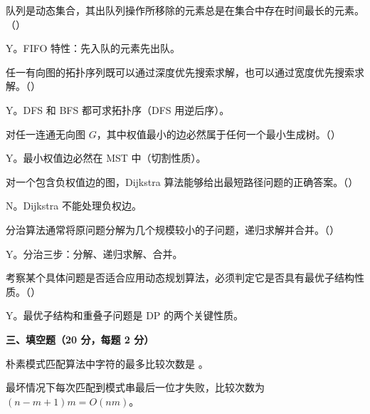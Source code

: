 \begin{question}
队列是动态集合，其出队列操作所移除的元素总是在集合中存在时间最长的元素。（\quad）
\begin{solution}
Y。FIFO 特性：先入队的元素先出队。
\end{solution}
\end{question}

\begin{question}
任一有向图的拓扑序列既可以通过深度优先搜索求解，也可以通过宽度优先搜索求解。（\quad）
\begin{solution}
Y。DFS 和 BFS 都可求拓扑序（DFS 用逆后序）。
\end{solution}
\end{question}

\begin{question}
对任一连通无向图 $G$，其中权值最小的边必然属于任何一个最小生成树。（\quad）
\begin{solution}
Y。最小权值边必然在 MST 中（切割性质）。
\end{solution}
\end{question}

\begin{question}
对一个包含负权值边的图，Dijkstra 算法能够给出最短路径问题的正确答案。（\quad）
\begin{solution}
N。Dijkstra 不能处理负权边。
\end{solution}
\end{question}

\begin{question}
分治算法通常将原问题分解为几个规模较小的子问题，递归求解并合并。（\quad）
\begin{solution}
Y。分治三步：分解、递归求解、合并。
\end{solution}
\end{question}

\begin{question}
考察某个具体问题是否适合应用动态规划算法，必须判定它是否具有最优子结构性质。（\quad）
\begin{solution}
Y。最优子结构和重叠子问题是 DP 的两个关键性质。
\end{solution}
\end{question}

\clearpage

\textbf{三、填空题（20 分，每题 2 分）}

\begin{question}
朴素模式匹配算法中字符的最多比较次数是 \underline{\hspace{4em}}。
\begin{solution}
最坏情况下每次匹配到模式串最后一位才失败，比较次数为 $(n-m+1)m=O(nm)$。
\end{solution}
\end{question}

